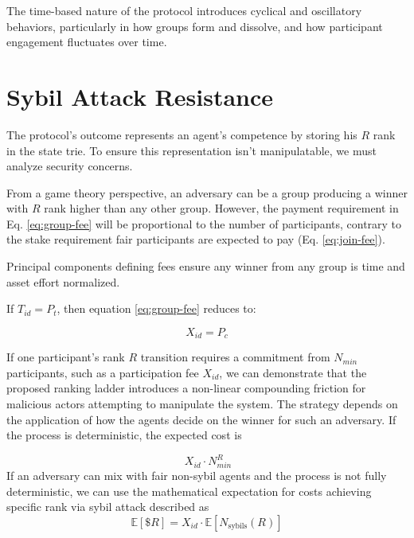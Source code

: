 \documentclass{article}
\begin{document}
\begin{CJK}{UTF8}{gbsn}
    The time-based nature of the protocol introduces cyclical and oscillatory behaviors, particularly in how groups form and dissolve, and how participant engagement fluctuates over time.

    \section{Sybil Attack Resistance}

    The protocol's outcome represents an agent's competence by storing his $R$ rank in the state trie. To ensure this representation isn't manipulatable, we must analyze security concerns.

    From a game theory perspective, an adversary can be a group producing a winner with $R$ rank higher than any other group. However, the payment requirement in Eq. \ref{eq:group-fee} will be proportional to the number of participants, contrary to the stake requirement fair participants are expected to pay (Eq. \ref{eq:join-fee}).

    Principal components defining fees ensure any winner from any group is time and asset effort normalized.

    If $T_{id} = P_t$, then equation \ref{eq:group-fee} reduces to:

    \begin{equation}
        \label{eq:join-fee-2}
        X_{id} = P_c
    \end{equation}

    If one participant's rank $R$ transition requires a commitment from $N_{min}$ participants, such as a participation fee $X_{id}$, we can demonstrate that the proposed ranking ladder introduces a non-linear compounding friction for malicious actors attempting to manipulate the system. The strategy depends on the application of how the agents decide on the winner for such an adversary. If the process is deterministic, the expected cost is

    \begin{equation}\
        \label{eq:direct-sybil-cost}
        X_{id} \cdot N_{min}^R
    \end{equation}
    If an adversary can mix with fair non-sybil agents and the process is not fully deterministic, we can use the mathematical expectation for costs achieving specific rank via sybil attack described as
    \begin{equation}
        \label{eq:math-expectation-sybil-cost}
        \mathbb{E}[\$R] = X_{id} \cdot \mathbb{E}[N_{\text{sybils}}(R)]
    \end{equation}


\end{CJK}
\end{document}

